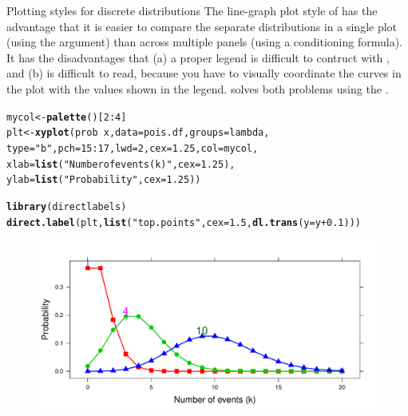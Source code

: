 \documentclass[11pt]{book}\usepackage[]{graphicx}\usepackage[]{color}
\makeatletter
\newcommand{\hlnum}[1]{\textcolor[rgb]{0.686,0.059,0.569}{#1}}%
\newcommand{\hlstr}[1]{\textcolor[rgb]{0.192,0.494,0.8}{#1}}%
\newcommand{\hlopt}[1]{\textcolor[rgb]{0,0,0}{#1}}%
\newcommand{\hlstd}[1]{\textcolor[rgb]{0.345,0.345,0.345}{#1}}%
\newcommand{\hlkwb}[1]{\textcolor[rgb]{0.69,0.353,0.396}{#1}}%
\newcommand{\hlkwc}[1]{\textcolor[rgb]{0.333,0.667,0.333}{#1}}%
\newcommand{\hlkwd}[1]{\textcolor[rgb]{0.737,0.353,0.396}{\textbf{#1}}}%
\newenvironment{kframe}{%
 \def\at@end@of@kframe{}%
 \ifinner\ifhmode%
  \def\at@end@of@kframe{\end{minipage}}%
  \begin{minipage}{\columnwidth}%
 \fi\fi%
 \def\FrameCommand##1{\hskip\@totalleftmargin \hskip-\fboxsep
 \colorbox{shadecolor}{##1}\hskip-\fboxsep
     \hskip-\linewidth \hskip-\@totalleftmargin \hskip\columnwidth}%
 \MakeFramed {\advance\hsize-\width
   \@totalleftmargin\z@ \linewidth\hsize
   \@setminipage}}%
 {\par\unskip\endMakeFramed%
 \at@end@of@kframe}
\newenvironment{knitrout}{}{} %
\renewenvironment{knitrout}{\small\renewcommand{\baselinestretch}{.85}}{} %
\makeatother
\begin{document}
\begin{Example}{Plotting styles for discrete distributions}
The line-graph plot style of  has the advantage that
it is easier to compare the separate distributions in a single plot 
(using the  argument) than
across multiple panels (using a conditioning formula). 
It has the disadvantages that (a) a proper legend is
difficult to contruct with , and (b) is difficult to read, because
you have to visually coordinate the curves in the plot with the values shown
in the legend.   solves both problems using
the .
\begin{knitrout}
\color{fgcolor}\begin{kframe}
\begin{alltt}
\hlstd{mycol} \hlkwb{<-} \hlkwd{palette}\hlstd{()[}\hlnum{2}\hlopt{:}\hlnum{4}\hlstd{]}
\hlstd{plt} \hlkwb{<-} \hlkwd{xyplot}\hlstd{( prob} \hlopt{~} \hlstd{x,} \hlkwc{data}\hlstd{=pois.df,} \hlkwc{groups}\hlstd{=lambda,}
  \hlkwc{type}\hlstd{=}\hlstr{"b"}\hlstd{,} \hlkwc{pch}\hlstd{=}\hlnum{15}\hlopt{:}\hlnum{17}\hlstd{,} \hlkwc{lwd}\hlstd{=}\hlnum{2}\hlstd{,} \hlkwc{cex}\hlstd{=}\hlnum{1.25}\hlstd{,} \hlkwc{col}\hlstd{=mycol,}
  \hlkwc{xlab}\hlstd{=}\hlkwd{list}\hlstd{(}\hlstr{"Number of events (k)"}\hlstd{,} \hlkwc{cex}\hlstd{=}\hlnum{1.25}\hlstd{),}
        \hlkwc{ylab}\hlstd{=}\hlkwd{list}\hlstd{(}\hlstr{"Probability"}\hlstd{,}  \hlkwc{cex}\hlstd{=}\hlnum{1.25}\hlstd{))}

\hlkwd{library}\hlstd{(directlabels)}
\hlkwd{direct.label}\hlstd{(plt,} \hlkwd{list}\hlstd{(}\hlstr{"top.points"}\hlstd{,} \hlkwc{cex}\hlstd{=}\hlnum{1.5}\hlstd{,} \hlkwd{dl.trans}\hlstd{(}\hlkwc{y}\hlstd{=y}\hlopt{+}\hlnum{0.1}\hlstd{)))}
\end{alltt}
\end{kframe}\begin{figure}[htbp]


\centerline{\includegraphics[width=.8\textwidth]{ch03/fig/dpois-xyplot2} }


\end{figure}
\end{knitrout}
\end{Example}
\end{document}
